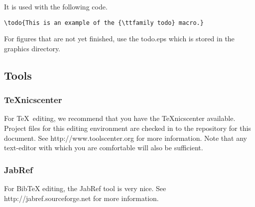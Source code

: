 It is used with the following code.
\begin{verbatim}
\todo{This is an example of the {\ttfamily todo} macro.}
\end{verbatim}

For figures that are not yet finished, use the {\ttfamily todo.eps} which is stored in the {\ttfamily graphics} directory.


\subsection{Tools}\label{sec:tools}

\subsubsection{\TeX nicscenter}
For \TeX\ editing, we recommend that you have the \TeX nicscenter available.
Project files for this editing environment are checked in to the repository for this document.
See http://www.toolscenter.org for more information.
Note that any text-editor with which you are comfortable will also be sufficient.

\subsubsection{JabRef}
For BibTeX editing, the JabRef tool is very nice.
See http://jabref.sourceforge.net for more information.
